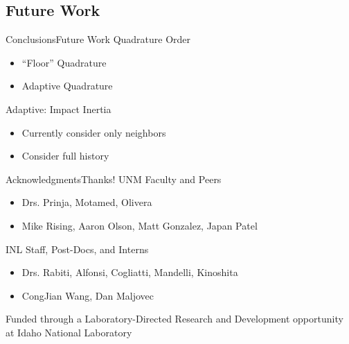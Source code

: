\documentclass{beamer}
\begin{document}
\subsection{Future Work}
\begin{frame}{Conclusions}{Future Work}\vspace{-20pt}
  \vfill
    Quadrature Order
      \begin{itemize}
        \item ``Floor'' Quadrature
        \item Adaptive Quadrature
      \end{itemize}
  \vfill
    Adaptive: Impact Inertia
      \begin{itemize}
        \item Currently consider only neighbors
        \item Consider full history
      \end{itemize}
  \vfill
\end{frame}

\begin{frame}{Acknowledgments}{Thanks!}\vspace{-20pt}
  \vfill
  UNM Faculty and Peers
  \begin{itemize}
    \item Drs. Prinja, Motamed, Olivera
    \item Mike Rising, Aaron Olson, Matt Gonzalez, Japan Patel
  \end{itemize}
  \vfill
  INL Staff, Post-Docs, and Interns
  \begin{itemize}
    \item Drs. Rabiti, Alfonsi, Cogliatti, Mandelli, Kinoshita
    \item CongJian Wang, Dan Maljovec
  \end{itemize}
  \vfill
  Funded through a Laboratory-Directed Research and Development opportunity at Idaho National Laboratory
\end{frame}
\end{document}
